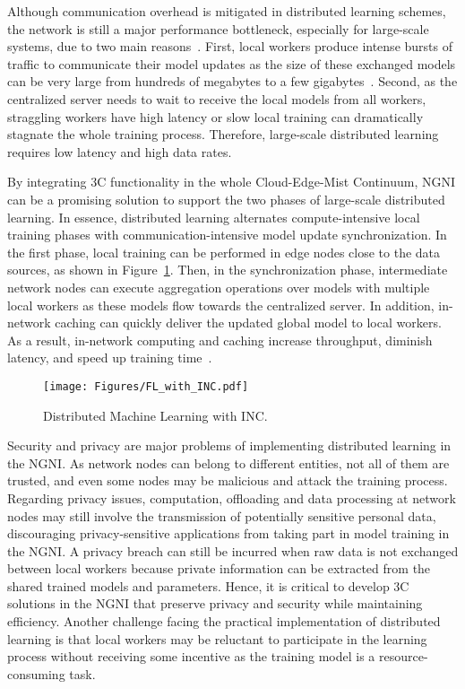 Although communication overhead is mitigated in distributed learning schemes, the network is still a major performance bottleneck, especially for large-scale systems, due to two main reasons~\cite{sapio2020scaling,dinh2021innetwork}. First, local workers produce intense bursts of traffic to communicate their model updates as the size of these exchanged models can be very large from hundreds of megabytes to a few gigabytes~\cite{dinh2021innetwork}.  Second, as the centralized server needs to wait to receive the local models from all workers, straggling workers have high latency or slow local training can dramatically stagnate the whole training process. Therefore, large-scale distributed learning requires low latency and high data rates.

By integrating 3C functionality in the whole Cloud-Edge-Mist Continuum, NGNI can be a promising solution to support the two phases of large-scale distributed learning. In essence, distributed learning alternates compute-intensive local training phases with communication-intensive model update synchronization. In the first phase, local training can be performed in edge nodes close to the data sources, as shown in Figure~\ref{fig:FL_with_INC}. Then, in the synchronization phase, intermediate network nodes can execute aggregation operations over models with multiple local workers as these models flow towards the centralized server. In addition, in-network caching can quickly deliver the updated global model to local workers. As a result, in-network computing and caching increase throughput, diminish latency, and speed up training time~\cite{sapio2020scaling,dinh2021innetwork}. 

 \begin{figure}
    \centering
    \texttt{[image: Figures/FL\_with\_INC.pdf]}
    \caption{Distributed Machine Learning with INC.}
    \label{fig:FL_with_INC}
\end{figure}

Security and privacy are major problems of implementing distributed learning in the NGNI. As network nodes can belong to different entities, not all of them are trusted, and even some nodes may be malicious and attack the training process. Regarding privacy issues, computation, offloading and data processing at network nodes may still involve the transmission of potentially sensitive personal data, discouraging privacy-sensitive applications from taking part in model training in the NGNI. A privacy breach can still be incurred when raw data is not exchanged between local workers because private information can be extracted from the shared trained models and parameters. Hence, it is critical to develop 3C solutions in the NGNI that preserve privacy and security while maintaining efficiency. Another challenge facing the practical implementation of distributed learning is that local workers may be reluctant to participate in the learning process without receiving some incentive as the training model is a resource-consuming task.
	
